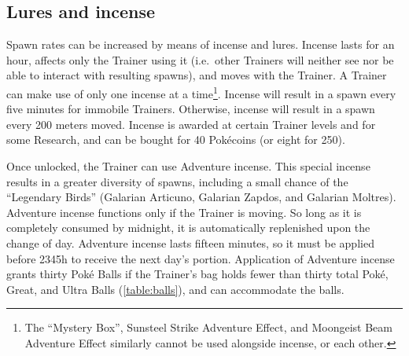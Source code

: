 \subsection{Lures and incense}
\label{subsec:lures}
Spawn rates can be increased by means of incense and lures.
Incense lasts for an hour, affects only the Trainer using it (i.e.\ other Trainers
  will neither see nor be able to interact with resulting spawns),
  and moves with the Trainer.
A Trainer can make use of only one incense at a time\footnote{The
  ``Mystery Box'', Sunsteel Strike Adventure Effect, and
  Moongeist Beam Adventure Effect similarly cannot be used
  alongside incense, or each other.}.
Incense will result in a spawn every five minutes for immobile Trainers.
Otherwise, incense will result in a spawn every 200 meters moved.
Incense is awarded at certain Trainer levels and for some Research,
  and can be bought for 40 Pokécoins (or eight for 250).

Once unlocked, the Trainer can use Adventure incense.
This special incense results in a greater diversity of spawns, including
  a small chance of the ``Legendary Birds''
  (Galarian Articuno, Galarian Zapdos, and Galarian Moltres).
Adventure incense functions only if the Trainer is moving.
So long as it is completely consumed by midnight, it is automatically replenished
  upon the change of day.
Adventure incense lasts fifteen minutes, so it must be applied before 2345h
  to receive the next day's portion.
Application of Adventure incense grants thirty Poké Balls if the Trainer's
  bag holds fewer than thirty total Poké, Great, and Ultra Balls (\autoref{table:balls}),
  and can accommodate the balls.

